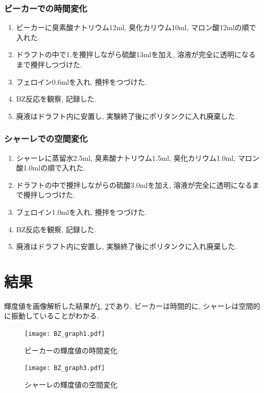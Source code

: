 \documentclass[11pt]{ltjsarticle}
\begin{document}
      \subsubsection*{ビーカーでの時間変化}
      \begin{enumerate}
        \item ビーカーに臭素酸ナトリウム12ml, 臭化カリウム10ml, マロン酸12mlの順で入れた.
        \item ドラフトの中で1.を攪拌しながら硫酸13mlを加え, 溶液が完全に透明になるまで攪拌しつづけた.
        \item フェロイン0.6mlを入れ, 攪拌をつづけた. 
        \item BZ反応を観察, 記録した.
        \item 廃液はドラフト内に安置し, 実験終了後にポリタンクに入れ廃棄した.
      \end{enumerate}
      \subsubsection*{シャーレでの空間変化}
      \begin{enumerate}
        \item シャーレに蒸留水2.5ml, 臭素酸ナトリウム1.5ml, 臭化カリウム1.0ml, マロン酸1.0mlの順で入れた.
        \item ドラフトの中で攪拌しながらの硫酸3.0mlを加え, 溶液が完全に透明になるまで攪拌しつづけた.
        \item フェロイン1.0mlを入れ, 攪拌をつづけた. 
        \item BZ反応を観察, 記録した.
        \item 廃液はドラフト内に安置し, 実験終了後にポリタンクに入れ廃棄した.
      \end{enumerate}
  \section*{結果}
  輝度値を画像解析した結果が\cref{fig:beaker_Intensity}, \cref{fig:dish_Intensity}であり, ビーカーは時間的に, シャーレは空間的に振動していることがわかる. 
    \begin{figure}[H]
      \centering
      \texttt{[image: BZ\_graph1.pdf]}
      \caption{ビーカーの輝度値の時間変化}
      \label{fig:beaker_Intensity}
    \end{figure}
    \begin{figure}[H]
      \centering
      \texttt{[image: BZ\_graph3.pdf]}
      \caption{シャーレの輝度値の空間変化}
      \label{fig:dish_Intensity}
    \end{figure}
\end{document}
